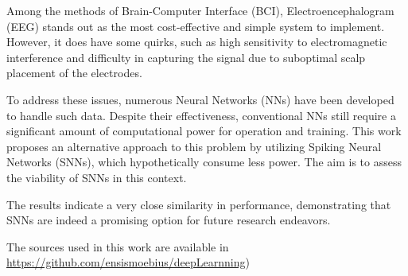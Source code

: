 \par Among the methods of Brain-Computer Interface (BCI), Electroencephalogram (EEG) stands out as the most cost-effective and simple system to implement. However, it does have some quirks, such as high sensitivity to electromagnetic interference and difficulty in capturing the signal due to suboptimal scalp placement of the electrodes.

\par To address these issues, numerous Neural Networks (NNs) have been developed to handle such data. Despite their effectiveness, conventional NNs still require a significant amount of computational power for operation and training. This work proposes an alternative approach to this problem by utilizing Spiking Neural Networks (SNNs), which hypothetically consume less power. The aim is to assess the viability of SNNs in this context.

\par The results indicate a very close similarity in performance, demonstrating that SNNs are indeed a promising option for future research endeavors.

\par The sources used in this work are available in \url{https://github.com/ensismoebius/deepLearnning})